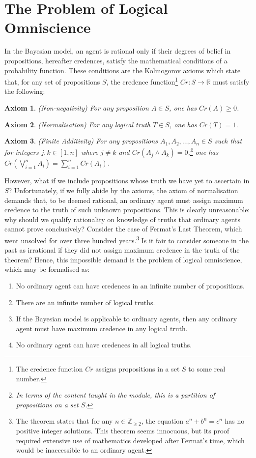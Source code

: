 \documentclass[12pt]{article}
\newtheorem{axiom}{Axiom}
\begin{document}
\section{The Problem of Logical Omniscience}
In the Bayesian model, an agent is rational only if their degrees of belief in propositions, hereafter credences, satisfy the mathematical conditions of a probability function.\autocite[13]{bdrc} These conditions are the Kolmogorov axioms which state that, for any set of propositions $S$, the credence function\footnote{The credence function $Cr$ assigns propositions in a set $S$ to some real number.} $Cr:S\rightarrow\mathbb{R}$ must satisfy the following:
\begin{axiom}
    (Non-negativity) For any proposition $A\in S$, one has $Cr(A)\geq0$.
\end{axiom}
\begin{axiom}
    (Normalisation) For any logical truth $T\in S$, one has $Cr(T)=1$.
\end{axiom}
\begin{axiom}
    (Finite Additivity) For any propositions $A_1, A_2,\dots, A_n\in S$ such that for integers $j,k\in[1,n]$ where $j\neq k$ and $Cr(A_j\land A_k)=0$,\footnote{In terms of the content taught in the module, this is a partition of propositions on a set $S$.} one has $Cr(\bigvee_{i=1}^{n}A_i)=\sum_{i=1}^{n}Cr(A_i)$.
\end{axiom}
However, what if we include propositions whose truth we have yet to ascertain in $S$? Unfortunately, if we fully abide by the axioms, the axiom of normalisation demands that, to be deemed rational, an ordinary agent must assign maximum credence to the truth of such unknown propositions. This is clearly unreasonable: why should we qualify rationality on knowledge of truths that ordinary agents cannot prove conclusively? Consider the case of Fermat's Last Theorem, which went unsolved for over three hundred years.\footnote{The theorem states that for any $n\in\mathbb{Z}_{\geq2}$, the equation $a^n+b^n=c^n$ has no positive integer solutions. This theorem seems innocuous, but its proof required extensive use of mathematics developed after Fermat's time, which would be inaccessible to an ordinary agent.} Is it fair to consider someone in the past as irrational if they did not assign maximum credence in the truth of the theorem?\autocite[108]{dogramaci} Hence, this impossible demand is the problem of logical omniscience, which may be formalised as:\autocite{youtube}
\begin{enumerate}[label=\textbf{P\arabic*:},leftmargin=0.5in]
    \item No ordinary agent can have credences in an infinite number of propositions.
    \item There are an infinite number of logical truths.
    \item If the Bayesian model is applicable to ordinary agents, then any ordinary agent must have maximum credence in any logical truth.
    \item No ordinary agent can have credences in all logical truths.
\end{enumerate}
\end{document}
